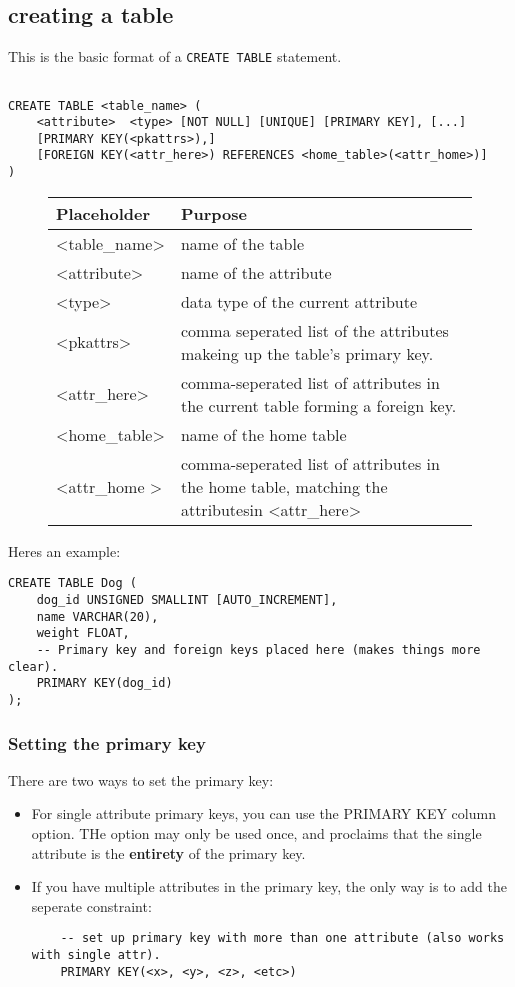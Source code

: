 \documentclass{report}
\begin{document}
\subsection{creating a table}
This is the basic format of a \texttt{CREATE TABLE} statement.
\begin{verbatim}

CREATE TABLE <table_name> (
    <attribute>  <type> [NOT NULL] [UNIQUE] [PRIMARY KEY], [...]
    [PRIMARY KEY(<pkattrs>),]
    [FOREIGN KEY(<attr_here>) REFERENCES <home_table>(<attr_home>)]
)
\end{verbatim}
    \begin{figure}[H]
    \centering
    \begin{tabular}{l l}
    \toprule 
    Placeholder & Purpose \\
    \midrule
    \textless table\_name\textgreater & name of the table \\
    \textless attribute\textgreater & name of the attribute \\
    \textless type\textgreater & data type of the current attribute \\
    \textless pkattrs\textgreater & comma seperated list of the attributes makeing up the table's primary key. \\
    \textless attr\_here\textgreater & comma-seperated list of attributes in the current table forming a foreign key. \\
    \textless home\_table\textgreater & name of the home table \\
    \textless attr\_home \textgreater & comma-seperated list of attributes in the home table, matching the attributesin \textless attr\_here\textgreater \\
    \bottomrule
    \end{tabular}
    \end{figure}
Heres an example:
\begin{verbatim}
CREATE TABLE Dog (
    dog_id UNSIGNED SMALLINT [AUTO_INCREMENT], 
    name VARCHAR(20),
    weight FLOAT,
    -- Primary key and foreign keys placed here (makes things more clear).
    PRIMARY KEY(dog_id)
);
\end{verbatim}
\subsubsection*{Setting the primary key}
There are two ways to set the primary key:
\begin{itemize}
    \item For single attribute primary keys, you can use the PRIMARY KEY column option. THe option may only be used once, and proclaims that the single attribute is the \textbf{entirety} of the primary key.
    \item If you have multiple attributes in the primary key, the only way is to add the seperate constraint:
    \begin{verbatim}
    -- set up primary key with more than one attribute (also works with single attr).
    PRIMARY KEY(<x>, <y>, <z>, <etc>)
    \end{verbatim}
\end{itemize}
\end{document}
